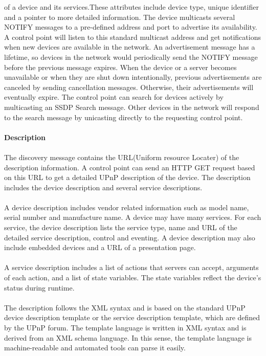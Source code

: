 of a device and its services.These attributes include device type, unique identifier and a 
pointer to more detailed information. The device multicasts several NOTIFY
messages to a pre-defined address and port to advertise its availability. A control point will listen to this standard multicast address and get 
notifications when new devices are available in the network. 
An advertisement message has a lifetime, so devices in the network would periodically send 
the NOTIFY message before the previous message expires. When the device or a server becomes unavailable or when they are shut down intentionally, previous advertisements are canceled by sending cancellation messages. Otherwise, their advertisements will eventually expire. 
The control point can search for devices actively by multicasting an SSDP Search message. Other devices 
in the network will respond to the search message by unicasting directly to the
requesting control point. \\
\\
\textbf{Description} \\
\\ 
The discovery message contains the URL(Uniform resource Locater) of the
description information. A control point can send an HTTP GET request based on
this URL to get a detailed UPnP description of the device. The description includes the device description and several service descriptions. \\
\\
A device description includes vendor related information such as model name,
 serial number and manufacture name. A device may have many services. For each service, the device description lists 
the service type, name and URL of the detailed service description, control and eventing. A device 
description may also include embedded devices and a URL of a presentation
page.\\
\\
A service description includes a list of actions that servers can accept, arguments of each action, 
and a list of state variables. The state variables reflect the device's status
during runtime. \\
\\
The description follows the XML syntax and is based on the standard UPnP device
description template or the service description template, which are defined by
the UPnP forum. The template language is written in XML syntax and is derived from an XML schema language. In this sense, the template language is machine-readable and automated tools can parse it easily. \\
